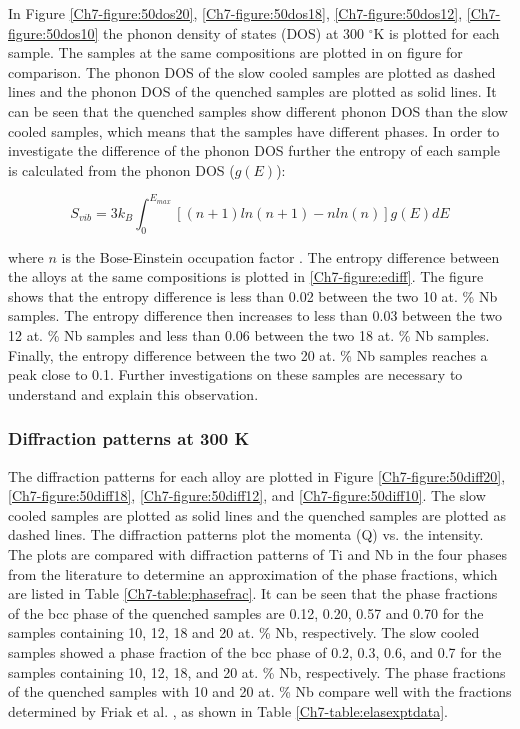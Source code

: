 In Figure \ref{Ch7-figure:50dos20}, \ref{Ch7-figure:50dos18}, \ref{Ch7-figure:50dos12}, \ref{Ch7-figure:50dos10} the phonon density of states (DOS) at 300 $^\circ$K is plotted for each sample. The samples at the same compositions are plotted in on figure for comparison. The phonon DOS of the slow cooled samples are plotted as dashed lines and the phonon DOS of the quenched samples are plotted as solid lines. It can be seen that the quenched samples show different phonon DOS than the slow cooled samples, which means that the samples have different phases. In order to investigate the difference of the phonon DOS further the entropy of each sample is calculated from the phonon DOS ($g(E)$):

\begin{equation}
\label{eq:phononentropy}
S_{vib} = 3 k_{B} \int_{0}^{E_{max}} \left[ \left( n+1 \right) ln\left(n+1\right) -n ln\left(n\right) \right] g(E) dE
\end{equation}

\noindent where $n$ is the Bose-Einstein occupation factor \cite{Budai2014}. The entropy difference between the alloys at the same compositions is plotted in \ref{Ch7-figure:ediff}. The figure shows that the entropy difference is less than 0.02 between the two 10 at. \% Nb samples. The entropy difference then increases to less than 0.03 between the two 12 at. \% Nb samples and less than 0.06 between the two 18 at. \% Nb samples. Finally, the entropy difference between the two 20 at. \% Nb samples reaches a peak close to 0.1. Further investigations on these samples are necessary to understand and explain this observation.

\subsubsection{Diffraction patterns at 300 K}

The diffraction patterns for each alloy are plotted in Figure \ref{Ch7-figure:50diff20}, \ref{Ch7-figure:50diff18}, \ref{Ch7-figure:50diff12}, and \ref{Ch7-figure:50diff10}. The slow cooled samples are plotted as solid lines and the quenched samples are plotted as dashed lines. The diffraction patterns plot the momenta (Q) vs. the intensity. The plots are compared with diffraction patterns of Ti and Nb in the four phases from the literature to determine an approximation of the phase fractions, which are listed in Table \ref{Ch7-table:phasefrac}. It can be seen that the phase fractions of the bcc phase of the quenched samples are 0.12, 0.20, 0.57 and 0.70 for the samples containing 10, 12, 18 and 20 at. \% Nb, respectively. The slow cooled samples showed  a phase fraction of the bcc phase of 0.2, 0.3, 0.6, and 0.7 for the samples containing 10, 12, 18, and 20 at. \% Nb, respectively. The phase fractions of the quenched samples with 10 and 20 at. \% Nb compare well with the fractions determined by Friak et al. \cite{Friak2012}, as shown in Table \ref{Ch7-table:elasexptdata}. 

